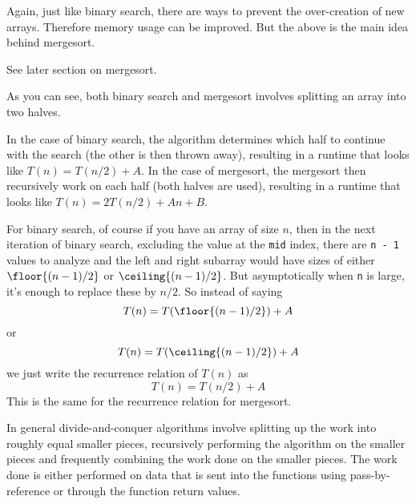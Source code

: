 Again, just like binary search, there are ways to prevent
the over-creation of new arrays. 
Therefore memory usage can be improved.
But the above is the main idea behind mergesort.

See later section on mergesort.

As you can see, both binary search and mergesort involves
splitting an array into two halves.
\begin{itemize}
\li In the case of binary search, the algorithm determines which
half to continue with the search (the other is then thrown away), 
resulting in a runtime that looks like
$T(n) = T(n/2) + A$.
\li In the case of mergesort, the mergesort then recursively
work on each half (both halves are used), resulting in 
a runtime that looks like
$T(n) = 2T(n/2) + An + B$.
\end{itemize}

For binary search, of course if you have an array of size $n$, then
in the next iteration of binary search, excluding the value at the \verb!mid! index,
there are \verb!n - 1! values to analyze
and the left and right subarray would have sizes of
either
$\floor{(n - 1)/2}$
or
$\ceiling{(n - 1)/2}$.
But asymptotically when \verb!n! is large,
it's enough to replace these by $n/2$.
So instead of saying 
\[
T(n) = T(\floor{(n - 1)/2}) + A
\]
or
\[
T(n) = T(\ceiling{(n - 1)/2}) + A
\]
we just write the recurrence relation of $T(n)$ as
\[
T(n) = T(n/2) + A
\]
This is the same for the recurrence relation for mergesort.

In general divide-and-conquer algorithms involve splitting
up the work into roughly equal smaller pieces, recursively
performing the algorithm on the smaller pieces
and frequently combining the work done on the smaller pieces.
The work done is either performed on data that is sent into
the functions using pass-by-reference
or through the function return values.










